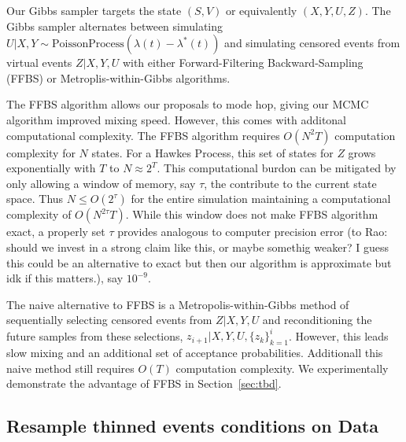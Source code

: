 \documentclass[11pt]{article}
\newcommand{\algrule}[1][.2pt]{\par\vskip.5\baselineskip\hrule height #1\par\vskip.5\baselineskip}
\begin{document}
Our Gibbs sampler targets the state $(S,V)$ or equivalently $(X,Y,U,Z)$. The Gibbs sampler alternates between simulating $U|X,Y \sim \text{PoissonProcess}(\lambda(t) - \lambda^*(t))$ and simulating censored events from virtual events $Z|X,Y,U$ with either Forward-Filtering Backward-Sampling (FFBS) or Metroplis-within-Gibbs algorithms. 


The FFBS algorithm allows our proposals to mode hop, giving our MCMC algorithm improved mixing speed. However, this comes with additonal computational complexity. The FFBS algorithm requires $O(N^2T)$ computation complexity for $N$ states. For a Hawkes Process, this set of states for $Z$ grows exponentially with $T$ to $N \approx 2^T$. This computational burdon can be mitigated by only allowing a window of memory, say $\tau$, the contribute to the current state space. Thus $N \leq O(2^\tau)$ for the entire simulation maintaining a computational complexity of $O(N^{2\tau} T)$. While this window does not make FFBS algorithm exact, a properly set $\tau$ provides analogous to computer precision error (to Rao: should we invest in a strong claim like this, or maybe somethig weaker? I guess this could be an alternative to exact but then our algorithm is approximate but idk if this matters.), say $10^{-9}$.


The naive alternative to FFBS is a Metropolis-within-Gibbs method of sequentially selecting censored events from $Z|X,Y,U$ and reconditioning the future samples from these selections, $z_{i+1} | X,Y,U,\{z_k\}_{k=1}^i$. However, this leads slow mixing and an additional set of acceptance probabilities. Additionall this naive method still requires $O(T)$ computation complexity. We experimentally demonstrate the advantage of FFBS in Section~\ref{sec:tbd}.




\subsection{Resample thinned events conditions on Data}
\end{document}
